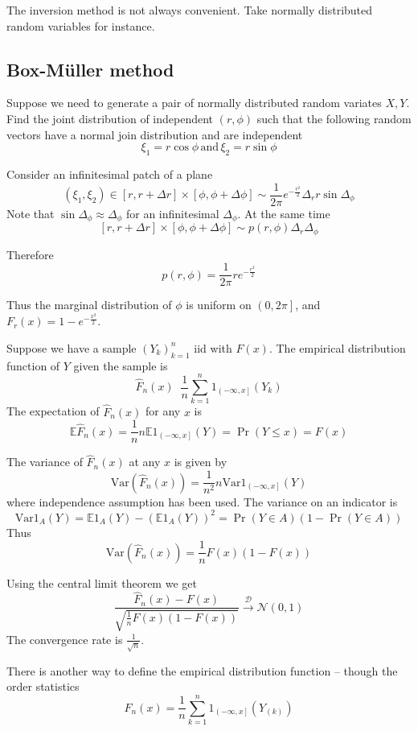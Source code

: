 \documentclass[a4paper]{article}
\newcommand{\clo}[1]{{\left [ #1 \right ]}}
\newcommand{\ploc}[1]{{\left ( #1 \right ]}}
\newcommand{\brac}[1]{{\left ( #1 \right )}}
\newcommand{\Ex}{\mathbb{E}}
\newcommand{\Var}{\text{Var}}
\newcommand{\defn}{\mathop{\overset{\Delta}{=}}\nolimits}
\begin{document}
The inversion method is not always convenient. Take normally distributed random variables for instance.


\subsection{Box-M\"uller method} %
\label{sub:box_muller_method}

Suppose we need to generate a pair of normally distributed random variates $X,Y$.
Find the joint distribution of independent $(r,\phi)$ such that the following random
vectors have a normal join distribution and are independent
\[\xi_1 = r \cos\phi\,\text{and}\,\xi_2 = r \sin\phi\]

Consider an infinitesimal patch of a plane
\[(\xi_1, \xi_2)\in\clo{r,r+\Delta r}\times \clo{\phi,\phi+\Delta \phi}\sim
\frac{1}{2\pi} e^{-\frac{r^2}{2}} \Delta_r r\sin \Delta_\phi\]
Note that $\sin\Delta_\phi\approx \Delta_\phi$ for an infinitesimal $\Delta_\phi$. At the same time
\[\clo{r,r+\Delta r}\times \clo{\phi,\phi+\Delta \phi} \sim p(r,\phi) \Delta_r\Delta_\phi\] 

Therefore
\[p(r,\phi) = \frac{1}{2\pi} r e^{-\frac{r^2}{2}}\]

Thus the marginal distribution of $\phi$ is uniform on $\ploc{0,2\pi}$, and $F_r(x) = 1 - e^{-\frac{x^2}{2}}$.


Suppose we have a sample $\brac{Y_k}_{k=1}^n$ iid with $F(x)$. The empirical distribution function of $Y$ given the sample is 
\[\hat{F}_n(x) \defn \frac{1}{n}\sum_{k=1}^n 1_\ploc{-\infty, x}(Y_k)\]
The expectation of $\hat{F}_n(x)$ for any $x$ is 
\[\Ex \hat{F}_n(x) = \frac{1}{n} n \Ex1_\ploc{-\infty, x}(Y) = \Pr\brac{Y\leq x} = F(x)\]

The variance of $\hat{F}_n(x)$ at any $x$ is given by
\[\Var\brac{\hat{F}_n(x)} = \frac{1}{n^2}n \Var{1_\ploc{-\infty, x}(Y)}\]
where independence assumption has been used.
The variance on an indicator is
\[\Var{1_A(Y)} = \Ex 1_A(Y) - \brac{\Ex 1_A(Y)}^2 = \Pr(Y\in A)\brac{1-\Pr(Y\in A)}\]
Thus \[\Var\brac{\hat{F}_n(x)} = \frac{1}{n} F(x)\brac{1-F(x)}\]

Using the central limit theorem we get
\[\frac{\hat{F}_n(x) - F(x)}{\sqrt{\frac{1}{n} F(x)\brac{1-F(x)}}}\overset{\mathcal{D}}{\to} \mathcal{N}(0,1)\]
The convergence rate is $\frac{1}{\sqrt{n}}$.

There is another way to define the empirical distribution function -- though the order statistics
\[\hat{F}_n(x) = \frac{1}{n}\sum_{k=1}^n 1_\ploc{-\infty,x}(Y_{(k)})\]
\end{document}
